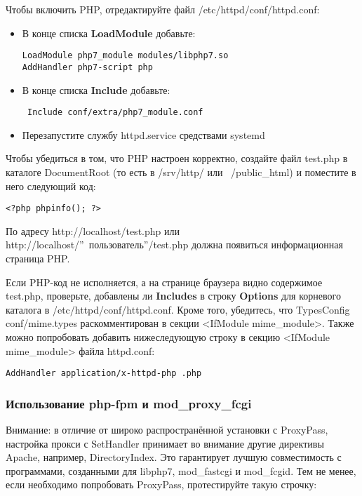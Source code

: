 \documentclass[a4paper,10pt,twoside]{article}
\begin{document}
Чтобы включить PHP, отредактируйте файл /etc/httpd/conf/httpd.conf:

\begin{itemize}
 \item В конце списка \textbf{LoadModule} добавьте:\\
\begin{verbatim}
LoadModule php7_module modules/libphp7.so
AddHandler php7-script php
\end{verbatim} 
\item В конце списка \textbf{Include} добавьте:
\begin{verbatim}
 Include conf/extra/php7_module.conf
\end{verbatim} 
\item Перезапустите службу httpd.service средствами systemd
\end{itemize}



Чтобы убедиться в том, что PHP настроен корректно, создайте файл test.php в каталоге DocumentRoot (то есть в /srv/http/ или ~/public\_html) и поместите в него следующий код:
\begin{verbatim}
<?php phpinfo(); ?>
\end{verbatim} 

По адресу http://localhost/test.php или http://localhost/''~пользователь''/test.php должна появиться информационная страница PHP.

Если PHP-код не исполняется, а на странице браузера видно содержимое test.php, проверьте, добавлены ли \textbf{Includes} в строку \textbf{Options} для корневого каталога в /etc/httpd/conf/httpd.conf. Кроме того, убедитесь, что TypesConfig conf/mime.types раскомментирован в секции <IfModule mime\_module>. Также можно попробовать добавить нижеследующую строку в секцию <IfModule mime\_module> файла httpd.conf:

\begin{verbatim}
AddHandler application/x-httpd-php .php
\end{verbatim} 

\subsubsection{Использование php-fpm и mod\_proxy\_fcgi}
Внимание: в отличие от широко распространённой установки с ProxyPass, настройка прокси с SetHandler принимает во внимание другие директивы Apache, например, DirectoryIndex. Это гарантирует лучшую совместимость с программами, созданными для libphp7, mod\_fastcgi и mod\_fcgid. Тем не менее, если необходимо попробовать ProxyPass, протестируйте такую строчку:
\end{document}
